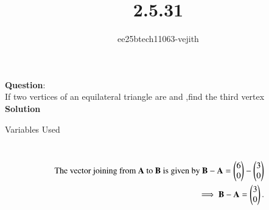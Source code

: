 \documentclass[journal]{IEEEtran}
\begin{document}

\vspace{3cm}

\title{2.5.31}
\author{ee25btech11063-vejith}

\maketitle
{\let\newpage\relax\maketitle}
\renewcommand{\thefigure}{\theenumi}
\renewcommand{\thetable}{\theenumi}
\setlength{\intextsep}{10pt} %
\textbf{Question}:\\
If two vertices of an equilateral triangle are  and ,find the third vertex\\
\textbf{Solution}\\
\begin{table}[h!]    
  \centering
  
  \caption{Variables Used}
  \label{}
\end{table}\\
\begin{align}
   \text{ The vector joining from }\Vec{A}\ \text{to } \Vec{B} \text{ is given by } \Vec{B}-\Vec{A}=\myvec{6\\0}-\myvec{3\\0}\\
\implies \Vec{B}-\vec{A}=\myvec{3\\0}.\\
\end{align}
\end{document}
